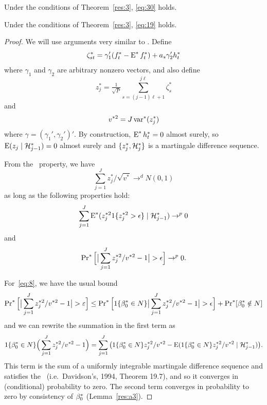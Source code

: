 \documentclass[12pt,fleqn]{article}
\begin{document}
\begin{lema}\label{SA5}
  Under the conditions of Theorem~\ref{res:3}, \eqref{eq:30} holds.
\end{lema}

\begin{lema}\label{lem-clt}
  Under the conditions of Theorem~\ref{res:3}, \eqref{eq:19} holds.
\end{lema}
\begin{proof}

  We will use arguments very similar to \cite{Cal:14}. Define
  \[
  \zeta_{st}^* = \gamma_1'(f_t^* - \operatorname{E}^* f_t^*) + a_s \gamma_2' h_t^*
  \]
  where $\gamma_1$ and $\gamma_2$ are arbitrary nonzero vectors, and
  also define
  \[
  z_j^* = \tfrac{1}{\sqrt{P}} \sum_{s=(j-1) \ell + 1}^{j\ell} \zeta_s^*
  \]
  and
  \[
  v^{*2} = J \operatorname{var}^*(z_j^*)
  \]
  where $\gamma = (\gamma_1', \gamma_2')'$. By construction, $\operatorname{E}^*
  h_t^* = 0$ almost surely, so $\operatorname{E}(z_j \mid \mathcal{H}_{j-1}^*) = 0$ almost
  surely and $\{z_j^*, \mathcal{H}_j^*\}$ is a martingale difference sequence.

  From the \mds\ property, we have
  \begin{equation*}
    \sum_{j=1}^J z_j^* / \sqrt{v^*} \to^d N(0, 1)
  \end{equation*}
  as long as the following properties hold:
  \begin{equation}\label{eq:7}
    \sum_{j=1}^J \operatorname{E}^*(z_j^{*2} 1\{z_j^{*2} > \epsilon\} \mid \mathcal{H}_{j-1}^*) \to^p 0
  \end{equation}
  and
  \begin{equation}\label{eq:8}
    \operatorname{Pr}^*\Big[ \big| \sum_{j=1}^J z_j^{*2}/v^{*2} - 1 \big| > \epsilon\Big] \to^p 0.
  \end{equation}

  For~\eqref{eq:8}, we have the usual bound
  \begin{equation*}
    \operatorname{Pr}^*\Big[ \big|\sum_{j=1}^J z_j^{*2}/v^{*2} - 1 \big| > \varepsilon\Big] \leq
    \operatorname{Pr}^*\Big[ 1\{\beta_0^* \in N\} \big| \sum_{j=1}^J z_j^{*2}/v^{*2} - 1 \big| > \epsilon \Big]
     + \operatorname{Pr}^*[ \beta_0^* \notin N ]
  \end{equation*}
  and we can rewrite the summation in the first term as
  \begin{equation*}
    1\{\beta_0^* \in N\} \Big( \sum_{j=1}^J z_j^{*2}/v^{*2} - 1 \Big)
    =  \sum_{j=1}^J \big(1\{\beta_0^* \in N\}z_j^{*2}/v^{*2} -
    \operatorname{E}(1\{\beta_0^* \in N\}z_j^{*2}/v^{*2} \mid \mathcal{H}_{j-1}^*) \big).
   \end{equation*}
   This term is the sum of a uniformly integrable martingale
   difference sequence and satisfies the \lln\ (i.e.\ Davidson's, 1994,
   Theorem 19.7), and so it converges in (conditional) probability to
   zero.  The second term converges in probability to zero by
   consistency of $\beta_0^*$ (Lemma~\ref{res:a3}).


\end{proof}
\end{document}
